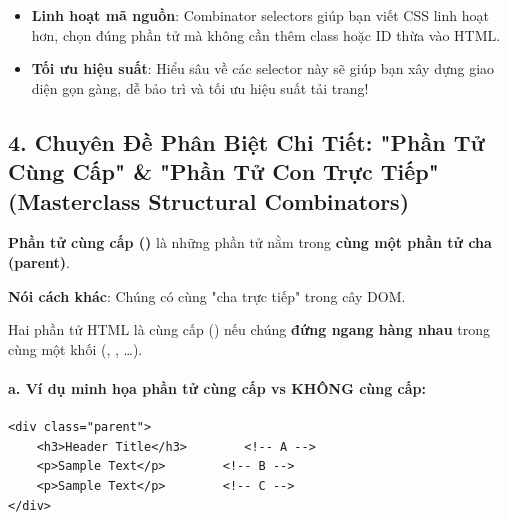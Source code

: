 \begin{tipBox}
\begin{itemize}[leftmargin=1.5em, itemsep=3pt, parsep=0pt]
    \item \textbf{Linh hoạt mã nguồn}: Combinator selectors giúp bạn viết CSS linh hoạt hơn, chọn đúng phần tử mà không cần thêm class hoặc ID thừa vào HTML.
    \item \textbf{Tối ưu hiệu suất}: Hiểu sâu về các selector này sẽ giúp bạn xây dựng giao diện gọn gàng, dễ bảo trì và tối ưu hiệu suất tải trang!
\end{itemize}
\end{tipBox}



\subsection{4. Chuyên Đề Phân Biệt Chi Tiết: "Phần Tử Cùng Cấp" \& "Phần Tử Con Trực Tiếp" (Masterclass Structural Combinators)}

\begin{conceptBox}
\textbf{Phần tử cùng cấp ()} là những phần tử nằm trong \textbf{cùng một phần tử cha (parent)}.
\par\vspace{3pt}
\textbf{Nói cách khác}: Chúng có cùng "cha trực tiếp" trong cây DOM.
\par\vspace{3pt}
\begin{tipBox}
Hai phần tử HTML là cùng cấp () nếu chúng \textbf{đứng ngang hàng nhau} trong cùng một khối (, , \ldots).
\end{tipBox}
\end{conceptBox}

\paragraph{a. Ví dụ minh họa phần tử cùng cấp vs KHÔNG cùng cấp:}

\begin{codeWindow}
\begin{lstlisting}[language=HTML5]
<div class="parent">
    <h3>Header Title</h3>        <!-- A -->
    <p>Sample Text</p>        <!-- B -->
    <p>Sample Text</p>        <!-- C -->
</div>
\end{lstlisting}
\end{codeWindow}

